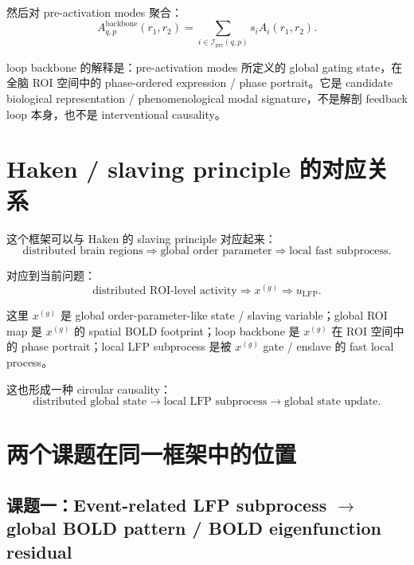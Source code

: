 \documentclass[11pt,a4paper]{ctexart}
\begin{document}
然后对 pre-activation modes 聚合：
\begin{equation}
    A_{q,p}^{\mathrm{backbone}}(r_1,r_2)
    =
    \sum_{i\in\mathcal I_{\mathrm{pre}}(q,p)} s_i A_i(r_1,r_2).
\end{equation}

loop backbone 的解释是：pre-activation modes 所定义的 global gating state，在全脑 ROI 空间中的 phase-ordered expression / phase portrait。它是 candidate biological representation / phenomenological modal signature，不是解剖 feedback loop 本身，也不是 interventional causality。

\section{Haken / slaving principle 的对应关系}

这个框架可以与 Haken 的 slaving principle 对应起来：
\begin{equation}
    \text{distributed brain regions}
    \Rightarrow
    \text{global order parameter}
    \Rightarrow
    \text{local fast subprocess}.
\end{equation}

对应到当前问题：
\begin{equation}
    \text{distributed ROI-level activity}
    \Rightarrow
    x^{(g)}
    \Rightarrow
    u_{\mathrm{LFP}}.
\end{equation}

这里 $x^{(g)}$ 是 global order-parameter-like state / slaving variable；global ROI map 是 $x^{(g)}$ 的 spatial BOLD footprint；loop backbone 是 $x^{(g)}$ 在 ROI 空间中的 phase portrait；local LFP subprocess 是被 $x^{(g)}$ gate / enslave 的 fast local process。

这也形成一种 circular causality：
\begin{equation}
    \text{distributed global state}
    \rightarrow
    \text{local LFP subprocess}
    \rightarrow
    \text{global state update}.
\end{equation}

\section{两个课题在同一框架中的位置}

\subsection{课题一：Event-related LFP subprocess $\rightarrow$ global BOLD pattern / BOLD eigenfunction residual}
\end{document}
